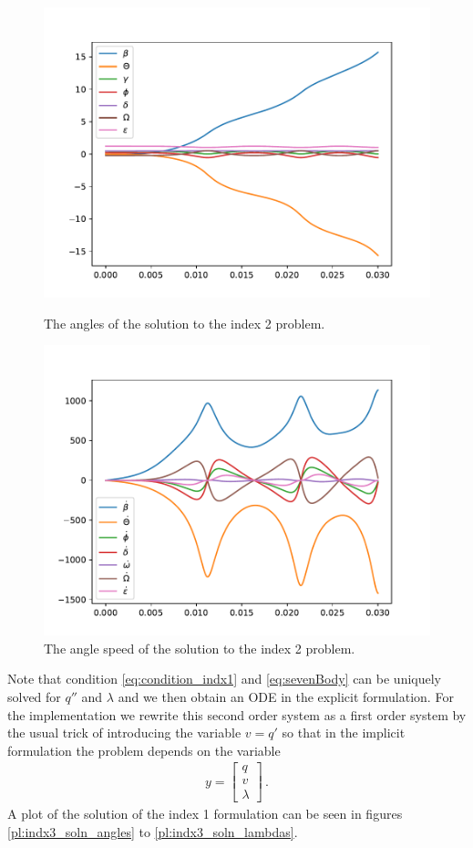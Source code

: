 \documentclass{report}
\newcommand{\vect}[1]{\begin{bmatrix} #1 \end{bmatrix}}
\begin{document}
\begin{figure}[b]
\centering
\begin{minipage}[t]{0.45\textwidth}
\centering
\includegraphics[width=\textwidth]{../Plots/Project2_main/Figure_510}
\caption{The angles of the solution to the index 2 problem.}
\label{pl:indx3_soln_angles}
\end{minipage}
\hfill
\begin{minipage}[t]{0.45\textwidth}
\centering
\includegraphics[width=\textwidth]{../Plots/Project2_main/Figure_511}
\caption{The angle speed of the solution to the index 2 problem.}
\label{pl:indx3_soln_anglesdot}
\end{minipage}
\end{figure}
Note that condition \eqref{eq:condition_indx1} and \eqref{eq:sevenBody} can be uniquely solved for $q''$ and $\lambda$ and we then obtain an ODE in the explicit formulation.
For the implementation we rewrite this second order system as a first order system by the usual trick of introducing the variable $v=q'$ so that in the implicit formulation the problem depends on the variable
\begin{align*}
	y = \vect{q \\ v \\ \lambda}\,.
\end{align*}
A plot of the solution of the index 1 formulation can be seen in figures \ref{pl:indx3_soln_angles} to \ref{pl:indx3_soln_lambdas}.
\end{document}
